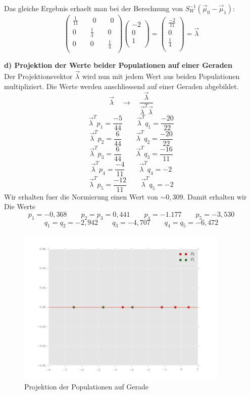 Das gleiche Ergebnis erhaelt man bei der Berechnung von $S_W^{-1}(\vec{\mu}_0 - \vec{\mu}_1)$:
\[
\left(
\begin {array} {c}
\frac{1}{11} \qquad 0 \qquad 0  \\
0 \qquad \frac{1}{3} \qquad 0  \\
0 \qquad 0 \qquad \frac{1}{4}  \\
\end {array}
\right)
\left(
\begin {array} {c}
-2  \\
0  \\
1  \\
\end {array}
\right)
=
\left(
\begin {array} {c}
\frac{-2}{11}  \\
0  \\
\frac{1}{4}  \\
\end {array}
\right)
= \vec{\lambda}
\]

\textbf{d) Projektion der Werte beider Populationen auf einer Geraden} \\
Der Projektionsvektor $\vec{\lambda}$ wird nun mit jedem Wert aus beiden Populationen multipliziert.
Die Werte werden anschliessend auf einer Geraden abgebildet.
\[
\vec{\lambda} \quad \rightarrow \quad \frac{\vec{\lambda}}{\vec{\lambda}^T\vec{\lambda}}
\]
\[
\vec{\lambda}^Tp_1 = \frac{-5}{44} \qquad \vec{\lambda}^Tq_1 = \frac{-20}{22}
\]
\[
\vec{\lambda}^Tp_2 = \frac{6}{44} \qquad \vec{\lambda}^Tq_2 = \frac{-20}{22}
\]
\[
\vec{\lambda}^Tp_3 = \frac{6}{44} \qquad \vec{\lambda}^Tq_3 = \frac{-16}{11}
\]
\[
\vec{\lambda}^Tp_4 = \frac{-4}{11} \qquad \vec{\lambda}^Tq_4 = -2
\]
\[
\vec{\lambda}^Tp_5 = \frac{-12}{11} \qquad \vec{\lambda}^Tq_5 = -2
\]
Wir erhalten fuer die Normierung einen Wert von $\sim 0,309$. Damit erhalten wir Die Werte
\[
p_1 = -0,368 \qquad p_2 = p_3 = 0,441 \qquad p_4 = -1.177 \qquad p_5 = -3,530
\]
\[
q_1 = q_2 = -2,942 \qquad q_3 = -4,707 \qquad q_4 = q_5 = -6,472
\]
\begin{figure}[htbp]
	\centering
	\includegraphics[width=0.9\textwidth]{aufg3.png}
	\caption{Projektion der Populationen auf Gerade}
\end{figure}

